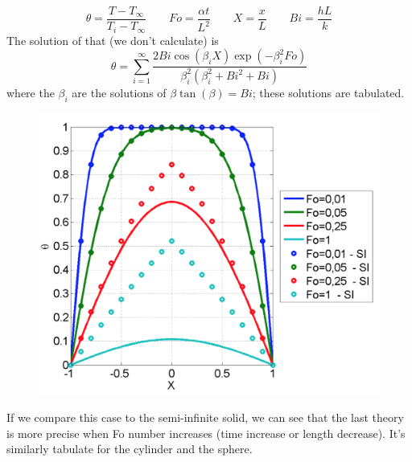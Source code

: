	 	\begin{equation}
	 		\theta = \frac{T-T_\infty}{T_i-T_\infty} \qquad Fo = \frac{\alpha t}{L^2} \qquad X = \frac{x}{L} \qquad Bi = \frac{hL}{k}
	 	\end{equation}
	 	The solution of that (we don't calculate) is 
	 	\begin{equation}
	 		\theta = \sum _{i=1}^\infty \frac{2Bi \cos (\beta _i X)\exp (-\beta _i^2 Fo)}{\beta _i^2 (\beta _i^2 + Bi^2+Bi)}
	 	\end{equation}
	 	where the $\beta _i$ are the solutions of $\beta \tan (\beta ) = Bi$; these solutions are tabulated. 
	 	
		\begin{figure}
		\vspace{-5mm}
		\includegraphics[scale=0.2]{ch4/8}
		\end{figure}	
	 	If we compare this case to the semi-infinite solid, we can see that the last theory is more precise when Fo number increases (time increase or length decrease).  It's similarly tabulate for the cylinder and the sphere. 